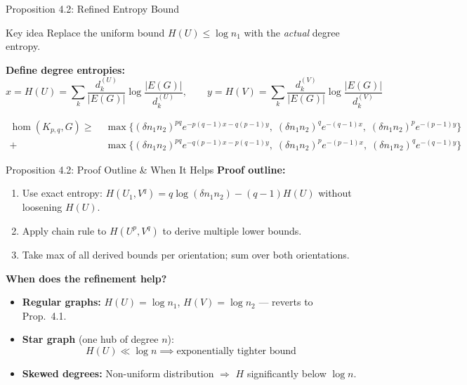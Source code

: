 \documentclass[10pt]{beamer}
\begin{document}
\begin{frame}{Proposition 4.2: Refined Entropy Bound}
  \begin{block}{Key idea}
    Replace the uniform bound $H(U) \leq \log n_1$ with the \textit{actual} degree entropy.
  \end{block}

  \textbf{Define degree entropies:}
  \[
    x = H(U) = \sum_k \frac{d_k^{(U)}}{|E(G)|} \log \frac{|E(G)|}{d_k^{(U)}}, \qquad
    y = H(V) = \sum_k \frac{d_k^{(V)}}{|E(G)|} \log \frac{|E(G)|}{d_k^{(V)}}
  \]

  \begin{theorem}[Proposition 4.2]
    \begin{align*}
      \hom(K_{p,q}, G) \geq\;
        &\max\!\bigl\{(\delta n_1 n_2)^{pq} e^{-p(q-1)x - q(p-1)y},\;
          (\delta n_1 n_2)^q e^{-(q-1)x},\;
          (\delta n_1 n_2)^p e^{-(p-1)y}\bigr\}\\
        +\;&\max\!\bigl\{(\delta n_1 n_2)^{pq} e^{-q(p-1)x - p(q-1)y},\;
          (\delta n_1 n_2)^p e^{-(p-1)x},\;
          (\delta n_1 n_2)^q e^{-(q-1)y}\bigr\}
    \end{align*}
  \end{theorem}
\end{frame}

\begin{frame}{Proposition 4.2: Proof Outline \& When It Helps}
  \textbf{Proof outline:}
  \begin{enumerate}
    \item Use exact entropy: $H(U_1, V^q) = q\log(\delta n_1 n_2) - (q-1)H(U)$ without loosening $H(U)$.
    \item Apply chain rule to $H(U^p, V^q)$ to derive multiple lower bounds.
    \item Take max of all derived bounds per orientation; sum over both orientations.
  \end{enumerate}

  \textbf{When does the refinement help?}
  \begin{itemize}
    \item \textbf{Regular graphs:} $H(U) = \log n_1$, $H(V) = \log n_2$ --- reverts to Prop.\ 4.1.
    \item \textbf{Star graph} (one hub of degree $n$):
      \[
        H(U) \ll \log n \implies \text{exponentially tighter bound}
      \]
    \item \textbf{Skewed degrees:} Non-uniform distribution $\Rightarrow$ $H$ significantly below $\log n$.
  \end{itemize}
\end{frame}
\end{document}
